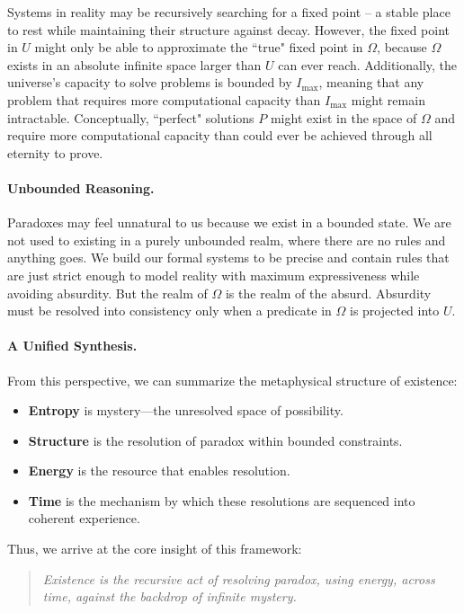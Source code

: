 \documentclass[12pt]{article}
\begin{document}
Systems in reality may be recursively searching for a fixed point -- a stable place to rest while maintaining their structure against decay. However, the fixed point in $U$ might only be able to approximate the ``true" fixed point in $\Omega$, because $\Omega$ exists in an absolute infinite space larger than $U$ can ever reach. Additionally, the universe's capacity to solve problems is bounded by $I_\text{max}$, meaning that any problem that requires more computational capacity than $I_\text{max}$ might remain intractable. Conceptually, ``perfect" solutions $P$ might exist in the space of $\Omega$ and require more computational capacity than could ever be achieved through all eternity to prove.

\paragraph{Unbounded Reasoning.} Paradoxes may feel unnatural to us because we exist in a bounded state. We are not used to existing in a purely unbounded realm, where there are no rules and anything goes. We build our formal systems to be precise and contain rules that are just strict enough to model reality with maximum expressiveness while avoiding absurdity. But the realm of $\Omega$ is the realm of the absurd. Absurdity must be resolved into consistency only when a predicate in $\Omega$ is projected into $U$.

\paragraph{A Unified Synthesis.}

From this perspective, we can summarize the metaphysical structure of existence:

\begin{itemize}
    \item \textbf{Entropy} is mystery—the unresolved space of possibility.
    \item \textbf{Structure} is the resolution of paradox within bounded constraints.
    \item \textbf{Energy} is the resource that enables resolution.
    \item \textbf{Time} is the mechanism by which these resolutions are sequenced into coherent experience.
\end{itemize}

Thus, we arrive at the core insight of this framework:

\begin{quote}
    \textit{Existence is the recursive act of resolving paradox, using energy, across time, against the backdrop of infinite mystery.}
\end{quote}
\end{document}
